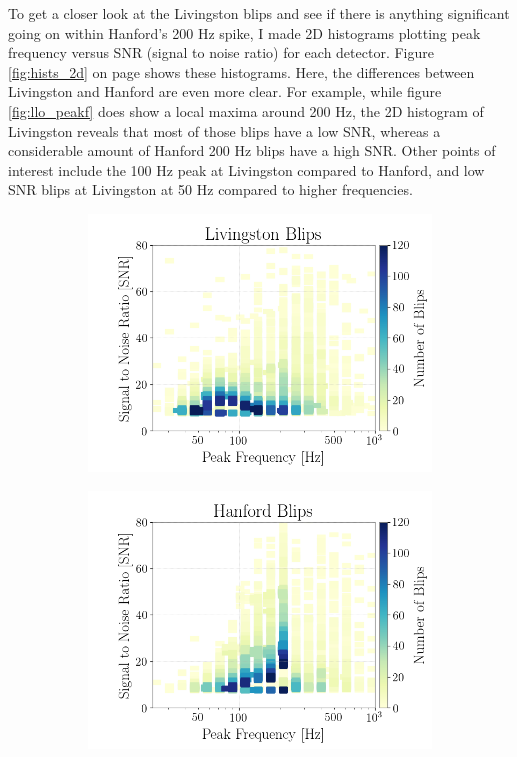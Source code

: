 \documentclass[a4paper]{article}
\begin{document}
To get a closer look at the Livingston blips and see if there is anything significant going on within Hanford's 200 Hz spike, I made 2D histograms plotting peak frequency versus SNR (signal to noise ratio) for each detector. Figure \ref{fig:hists_2d}  on page \pageref{fig:hists_2d} shows these histograms. Here, the differences between Livingston and Hanford are even more clear. For example, while figure \ref{fig:llo_peakf} does show a local maxima around 200 Hz, the 2D histogram of Livingston reveals that most of those blips have a low SNR, whereas a considerable amount of Hanford 200 Hz blips have a high SNR. Other points of interest include the 100 Hz peak at Livingston compared to Hanford, and low SNR blips at Livingston at 50 Hz compared to higher frequencies. 

\begin{figure}[h!]
	\centering
	\begin{subfigure}{.49\textwidth}
		\centering
		\includegraphics[width=1\linewidth]{llo_2d}
		\label{fig:llo_2d}
	\end{subfigure}
	\begin{subfigure}{.49\textwidth}
		\centering
		\includegraphics[width=1\linewidth]{lho_2d}

\end{subfigure}
\end{figure}
\end{document}
